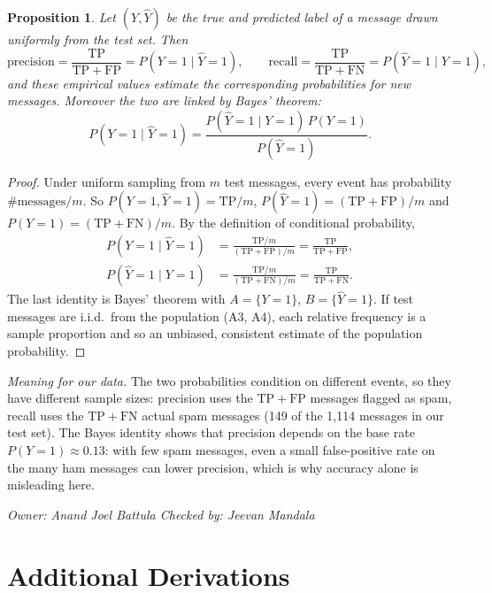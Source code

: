 \documentclass[11pt]{article}
\newcommand{\owner}[2]{\par\noindent\textit{Owner: #1 \hfill Checked by: #2}\par\medskip}
\theoremstyle{plain}
\newtheorem{proposition}[theorem]{Proposition}
\theoremstyle{definition}
\begin{document}
\begin{proposition}\label{prop:prec}
Let $(Y,\hat Y)$ be the true and predicted label of a message drawn uniformly from the test set.
Then
\[
\text{precision}=\frac{\mathrm{TP}}{\mathrm{TP}+\mathrm{FP}}=P(Y=1\mid\hat Y=1),\qquad
\text{recall}=\frac{\mathrm{TP}}{\mathrm{TP}+\mathrm{FN}}=P(\hat Y=1\mid Y=1),
\]
and these empirical values estimate the corresponding probabilities for new messages.
Moreover the two are linked by Bayes' theorem:
\[
P(Y=1\mid\hat Y=1)=\frac{P(\hat Y=1\mid Y=1)\,P(Y=1)}{P(\hat Y=1)}.
\]
\end{proposition}
\begin{proof}
Under uniform sampling from $m$ test messages, every event has probability
$\#\text{messages}/m$. So $P(Y=1,\hat Y=1)=\mathrm{TP}/m$,
$P(\hat Y=1)=(\mathrm{TP}+\mathrm{FP})/m$ and $P(Y=1)=(\mathrm{TP}+\mathrm{FN})/m$. By the
definition of conditional probability,
\begin{align*}
P(Y=1\mid\hat Y=1)&=\frac{\mathrm{TP}/m}{(\mathrm{TP}+\mathrm{FP})/m}=\frac{\mathrm{TP}}{\mathrm{TP}+\mathrm{FP}},\\
P(\hat Y=1\mid Y=1)&=\frac{\mathrm{TP}/m}{(\mathrm{TP}+\mathrm{FN})/m}=\frac{\mathrm{TP}}{\mathrm{TP}+\mathrm{FN}}.
\end{align*}
The last identity is Bayes' theorem with $A=\{Y=1\}$, $B=\{\hat Y=1\}$. If test messages are
i.i.d.\ from the population (A3, A4), each relative frequency is a sample proportion and so an
unbiased, consistent estimate of the population probability.
\end{proof}
\noindent\emph{Meaning for our data.} The two probabilities condition on different events, so they
have different sample sizes: precision uses the $\mathrm{TP}+\mathrm{FP}$ messages flagged as spam,
recall uses the $\mathrm{TP}+\mathrm{FN}$ actual spam messages (149 of the 1,114 messages
in our test set). The Bayes identity shows that precision depends on the base rate $P(Y=1)\approx0.13$:
with few spam messages, even a small false-positive rate on the many ham messages can lower precision,
which is why accuracy alone is misleading here.
\owner{Anand Joel Battula}{Jeevan Mandala}

\section{Additional Derivations}\label{sec:extra}
\end{document}
